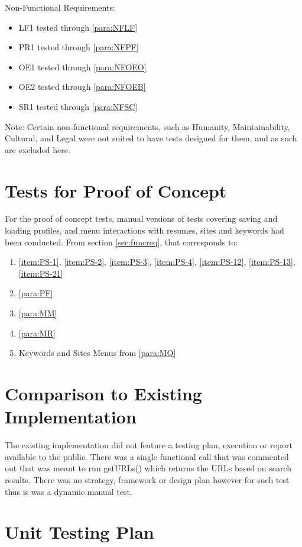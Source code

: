 \documentclass[12pt, titlepage]{article}
\begin{document}
\noindent Non-Functional Requirements:

\begin{itemize}
    \item LF1 tested through \ref{para:NFLF}
    \item PR1 tested through \ref{para:NFPF}
    \item OE1 tested through \ref{para:NFOEO}
    \item OE2 tested through \ref{para:NFOEB}
    \item SR1 tested through \ref{para:NFSC}
\end{itemize}

\noindent Note: Certain non-functional requirements, such as Humanity, Maintainability, Cultural, and Legal were not suited to have tests designed for them, and as such are excluded here. 

\section{Tests for Proof of Concept}

For the proof of concept tests, manual versions of tests covering saving and loading profiles, and menu interactions with resumes, sites and keywords had been conducted. From section \ref{sec:funcreq}, that corresponds to:

\begin{enumerate}
  \item \ref{item:PS-1}, \ref{item:PS-2}, \ref{item:PS-3}, \ref{item:PS-4}, \ref{item:PS-12}, \ref{item:PS-13}, \ref{item:PS-21} 
  \item \ref{para:PF}
  \item \ref{para:MM}
  \item \ref{para:MR}
  \item Keywords and Sites Menus from \ref{para:MO}
\end{enumerate}

	
\section{Comparison to Existing Implementation}	
The existing implementation did not feature a testing plan, execution or report available to the public. There was a single functional call that was commented out that was meant to run getURLs() which returns the URLs based on search results. There was no strategy, framework or design plan however for such test thus is was a dynamic manual test.


\section{Unit Testing Plan}
\end{document}
